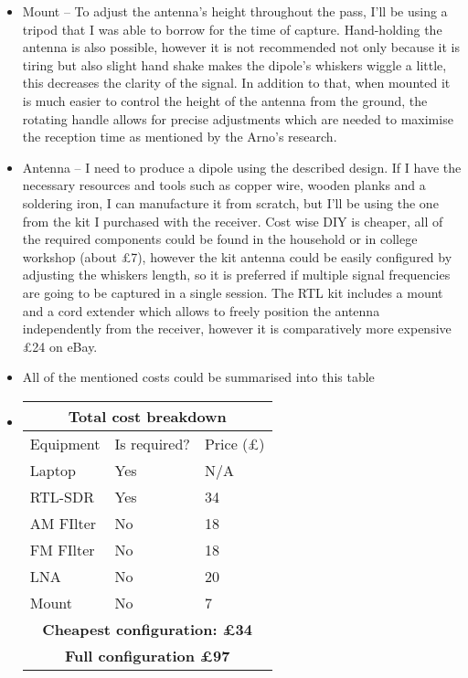 \documentclass{article}
\begin{document}
\begin{itemize}
        \item Mount -- To adjust the antenna's height throughout the pass, I'll be using a tripod that I was able to borrow for the time of capture. Hand-holding the antenna is also possible, however it is not recommended not only because it is tiring but also slight hand shake makes the dipole's whiskers wiggle a little, this decreases the clarity of the signal. In addition to that, when mounted it is much easier to control the height of the antenna from the ground, the rotating handle allows for precise adjustments which are needed to maximise the reception time as mentioned by the Arno's research.
        \item Antenna -- I need to produce a dipole using the described design. If I have the necessary resources and tools such as copper wire, wooden planks and a soldering iron, I can manufacture it from scratch, but I'll be using the one from the kit I purchased with the receiver. Cost wise DIY is cheaper, all of the required components could be found in the household or in college workshop (about £7), however the kit antenna could be easily configured by adjusting the whiskers length, so it is preferred if multiple signal frequencies are going to be captured in a single session. The RTL kit includes a mount and a cord extender which allows to freely position the antenna independently from the receiver, however it is comparatively more expensive £24 on eBay.

        \item All of the mentioned costs could be summarised into this table
        
        \item[] \begin{tabular}{ |p{3cm}||p{3cm}|p{3cm}|  }
             \hline
             \multicolumn{3}{|c|}{\textbf{Total cost breakdown}} \\
             \hline
             Equipment & Is required? & Price (£)\\
             \hline
             Laptop & Yes & N/A\\
             RTL-SDR & Yes & 34\\
             AM FIlter & No & 18\\
             FM FIlter & No & 18\\
             LNA & No & 20\\
             Mount & No & 7\\
             
             \hline
             \multicolumn{3}{|c|}{\textbf{Cheapest configuration: £34}} \\
             \hline
             \multicolumn{3}{|c|}{\textbf{Full configuration £97}} \\
             \hline
            \end{tabular}


\end{itemize}
\end{document}
